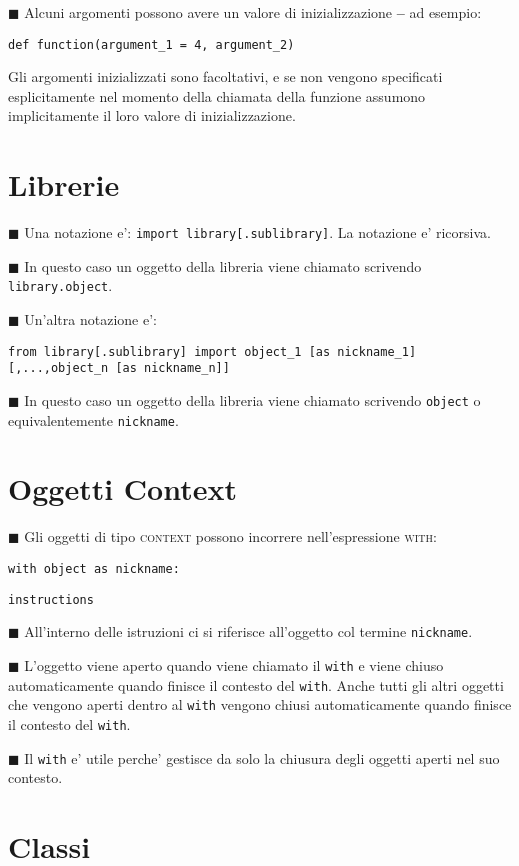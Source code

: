 \documentclass[a4paper,12pt,fleqn,leqno,twoside]{article}
\renewcommand{\b}{\textbf} %
\newcommand{\tw}{\texttt} %
\renewcommand{\sc}{\textsc} %
\newcommand{\bbox}{{\scriptsize $\blacksquare$}} %
\newcommand{\skipline}{\vspace{\baselineskip}} %
\newcommand{\bitem}[1]{\bbox \; #1\par \skipline}
\begin{document}
\bitem{Alcuni argomenti possono avere un valore di inizializzazione \b{--} ad esempio:\par
\tw{def function(argument\_1 = 4, argument\_2)}\par
Gli argomenti inizializzati sono facoltativi, e se non vengono specificati esplicitamente nel momento della chiamata della funzione assumono implicitamente il loro valore di inizializzazione.}

\section{Librerie}

\bitem{Una notazione e': \tw{import library[.sublibrary]}. La notazione e' ricorsiva.}

\bitem{In questo caso un oggetto della libreria viene chiamato scrivendo \tw{library.object}.}

\bitem{Un'altra notazione e':\par
\tw{from library[.sublibrary] import object\_1 [as nickname\_1][,...,object\_n [as nickname\_n]]}}

\skipline

\bitem{In questo caso un oggetto della libreria viene chiamato scrivendo \tw{object} o equivalentemente \tw{nickname}.}

\section{Oggetti Context}

\bitem{Gli oggetti di tipo \sc{context} possono incorrere nell'espressione \sc{with}:}

\tw{with object as nickname:}\par
\tw{\qquad instructions}

\skipline

\bitem{All'interno delle istruzioni ci si riferisce all'oggetto col termine \tw{nickname}.}

\bitem{L'oggetto viene aperto quando viene chiamato il \tw{with} e viene chiuso automaticamente quando finisce il contesto del \tw{with}. Anche tutti gli altri oggetti che vengono aperti dentro al \tw{with} vengono chiusi automaticamente quando finisce il contesto del \tw{with}.}

\bitem{Il \tw{with} e' utile perche' gestisce da solo la chiusura degli oggetti aperti nel suo contesto.}

\section{Classi}
\end{document}
